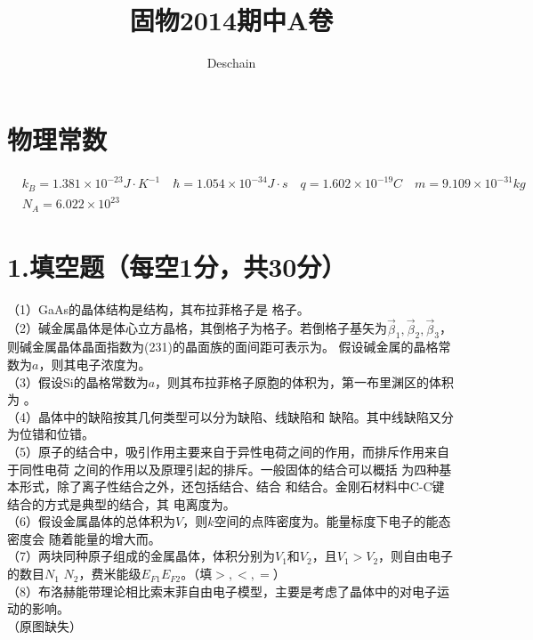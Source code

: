 \documentclass[UTF8]{ctexart}
\title{固物2014期中A卷}
\author{Deschain}
\begin{document}
\maketitle
\section*{\bfseries 物理常数}
\begin{equation*}
    \begin{aligned}
        & k_B=1.381\times10^{-23}J\cdot K^{-1}\quad\hbar=1.054\times10^{-34}J\cdot s\quad 
        q=1.602\times10^{-19}C\quad m=9.109\times10^{-31}kg\\
        & N_A=6.022\times10^{23}
    \end{aligned}
\end{equation*}
\section*{\bfseries 1.填空题（每空1分，共30分）}
（1）GaAs的晶体结构是\uline{\makebox[4em]{}}结构，其布拉菲格子是\uline{\makebox[6em]{}}
格子。\\
（2）碱金属晶体是体心立方晶格，其倒格子为\uline{\makebox[6em]{}}格子。若倒格子基矢为$\vec\beta_1,
\vec\beta_2,\vec\beta_3$，则碱金属晶体晶面指数为(231)的晶面族的面间距可表示为\uline{\makebox[10em]{}}。
假设碱金属的晶格常数为$a$，则其电子浓度为\uline{\makebox[2em]{}}。\\
（3）假设Si的晶格常数为$a$，则其布拉菲格子原胞的体积为\uline{\makebox[2em]{}}，第一布里渊区的体积为
\uline{\makebox[3em]{}}。\\
（4）晶体中的缺陷按其几何类型可以分为\uline{\makebox[2em]{}}缺陷、线缺陷和\uline{\makebox[2em]{}}
缺陷。其中线缺陷又分为\uline{\makebox[3em]{}}位错和\makebox[2em]{}位错。\\
（5）原子的结合中，吸引作用主要来自于异性电荷之间的\uline{\makebox[3em]{}}作用，而排斥作用来自于同性电荷
之间的\uline{\makebox[3em]{}}作用以及\uline{\makebox[7em]{}}原理引起的排斥。一般固体的结合可以概括
为四种基本形式，除了离子性结合之外，还包括\uline{\makebox[4em]{}}结合、\uline{\makebox[4em]{}}结合
和\uline{\makebox[9em]{}}结合。金刚石材料中C-C键结合的方式是典型的\uline{\makebox[3em]{}}结合，其
电离度为\uline{\makebox[2em]{}}。\\
（6）假设金属晶体的总体积为$V$，则$k$空间的点阵密度为\uline{\makebox[3em]{}}。能量标度下电子的能态密度会
随着能量的增大而\uline{\makebox[3em]{}}。\\
（7）两块同种原子组成的金属晶体，体积分别为$V_1$和$V_2$，且$V_1>V_2$，则自由电子的数目$N_1$
\uline{\makebox[2em]{}}$N_2$，费米能级$E_{F1}$\uline{\makebox[2em]{}}$E_{F2}$。（填$>,<,=$）\\
（8）布洛赫能带理论相比索末菲自由电子模型，主要是考虑了晶体中的\uline{\makebox[7em]{}}对电子运动的影响。\\
（原图缺失）\\
\end{document}

